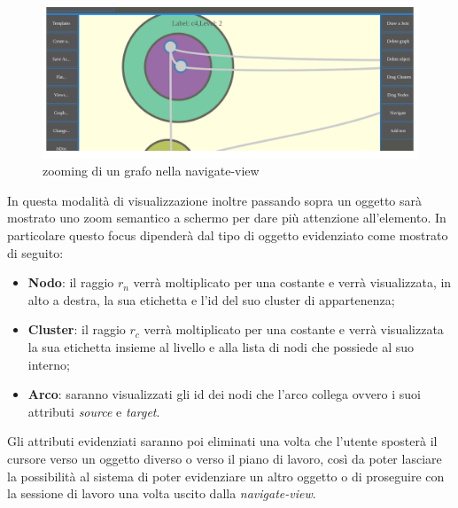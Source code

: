 {\begin{figure}[!htb]
	\begin{center}
		\includegraphics[width=1 \linewidth]{figure/zoomGraph}
	\end{center}
	\caption{zooming di un grafo nella navigate-view\label{fig:zoomGraph}}
\end{figure}
\newline
In questa modalità di visualizzazione inoltre passando sopra un oggetto sarà mostrato uno zoom semantico a schermo per dare più attenzione all'elemento. In particolare questo focus dipenderà dal tipo di oggetto evidenziato come mostrato di seguito:
\begin{itemize}
	\item \textbf{Nodo}: il raggio $r_n$ verrà moltiplicato per una costante e verrà visualizzata, in alto a destra, la sua etichetta e l'id del suo cluster di appartenenza;
	\item \textbf{Cluster}: il raggio $r_c$ verrà moltiplicato per una costante e verrà visualizzata la sua etichetta insieme al livello e alla lista di nodi che possiede al suo interno;
	\item \textbf{Arco}: saranno visualizzati gli id dei nodi che l'arco collega ovvero i suoi attributi \textit{source} e \textit{target}.
\end{itemize}
Gli attributi evidenziati saranno poi eliminati una volta che l'utente sposterà il cursore verso un oggetto diverso o verso il piano di lavoro, così da poter lasciare la possibilità al sistema di poter evidenziare un altro oggetto o di proseguire con la sessione di lavoro una volta uscito dalla \textit{navigate-view}.\\

}
